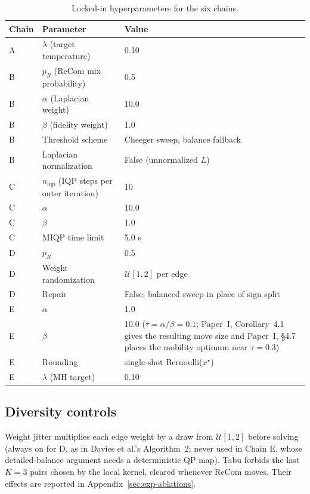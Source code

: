 \documentclass[11pt]{article}
\begin{document}
\begin{table}[htbp]
\centering
\small
\begin{tabular}{lll}
\toprule
Chain & Parameter & Value \\
\midrule
A & $\lambda$ (target temperature) & 0.10 \\
B & $p_R$ (ReCom mix probability) & 0.5 \\
B & $\alpha$ (Laplacian weight) & 10.0 \\
B & $\beta$ (fidelity weight) & 1.0 \\
B & Threshold scheme & Cheeger sweep, balance fallback \\
B & Laplacian normalization & False (unnormalized $L$) \\
C & $n_{\mathrm{iqp}}$ (IQP steps per outer iteration) & 10 \\
C & $\alpha$ & 10.0 \\
C & $\beta$ & 1.0 \\
C & MIQP time limit & 5.0 s \\
D & $p_R$ & 0.5 \\
D & Weight randomization & $\mathcal{U}[1, 2]$ per edge \\
D & Repair & False; balanced sweep in place of sign split \\
E & $\alpha$ & 1.0 \\
E & $\beta$ & 10.0 ($\tau = \alpha/\beta = 0.1$; Paper~I, Corollary~4.1 gives the resulting move size and Paper~I, \S4.7 places the mobility optimum near $\tau = 0.3$) \\
E & Rounding & single-shot Bernoulli($x^\star$) \\
E & $\lambda$ (MH target) & 0.10 \\
\bottomrule
\end{tabular}
\caption{Locked-in hyperparameters for the six
  chains.}\label{tab:hyperparams}
\end{table}

\subsection{Diversity controls}\label{app:diversity}

Weight jitter multiplies each edge weight by a draw from
$\mathcal{U}[1, 2]$ before solving (always on for D, as in Davies et
al.'s Algorithm~2; never used in Chain E, whose detailed-balance
argument needs a deterministic QP map). Tabu forbids the last $K = 3$
pairs chosen by the local kernel, cleared whenever ReCom moves.
Their effects are reported in Appendix~\ref{sec:exp-ablations}.
\end{document}
